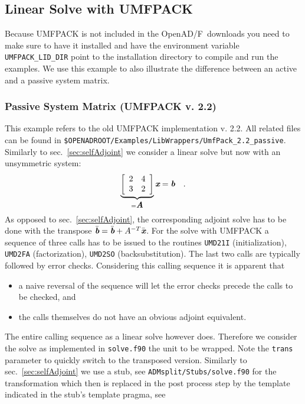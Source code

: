 \documentclass{book}
\newcommand{\OpenADF}{OpenAD/F}
\newcommand{\bmA}{\mbox{\bf\em A}}
\newcommand{\bmb}{\mbox{\bf\em b}}
\newcommand{\bmx}{\mbox{\bf\em x}}
\newcommand{\refsec}[1]{{sec.~\ref{#1}}}
\begin{document}
\subsection{Linear Solve with UMFPACK}\label{sec:umfpack}
Because UMFPACK \cite{umfpackWeb} is not included in the \OpenADF\ downloads you need to make sure to have it installed and have the environment variable \lstinline{UMFPACK_LID_DIR} point to the installation directory to compile and run the examples. 
We use this example to also illustrate the difference between an active and a passive system matrix. 
\subsubsection{Passive System Matrix (UMFPACK v. 2.2)}\label{sec:umfpackPassive}  
This example refers to the old UMFPACK implementation v. 2.2.  
All related files can be found in 
\lstinline{$OPENADROOT/Examples/LibWrappers/UmfPack_2.2_passive}. %
Similarly to \refsec{sec:selfAdjoint} we consider a linear solve but now with an unsymmetric system: 
\[
\underbrace{\left[\begin{array}{cc}
2 & 4 \\
3 & 2 
\end{array}\right]}_{=\bmA} \bmx=\bmb \quad .
\]
As opposed to \refsec{sec:selfAdjoint}, the corresponding adjoint solve has to be done with the transpose
$\bar{\bmb}=\bar{\bmb}+A^{-T}\bar{\bmx}$.
For the solve with UMFPACK a sequence of three calls has to be issued to the routines
\lstinline{UMD21I} (initialization),  \lstinline{UMD2FA} (factorization), \lstinline{UMD2SO} (backsubstitution).
The last two calls are typically followed by error checks. Considering this calling sequence it is apparent that 
\begin{itemize} 
\item a naive reversal of the sequence will let the error checks precede the calls to be checked, and 
\item the calls themselves do not have an obvious adjoint equivalent.
\end{itemize}
The entire calling sequence as a linear solve however does.  Therefore we consider the solve as implemented in 
\lstinline{solve.f90} the unit to be wrapped. Note the \lstinline{trans} parameter to quickly switch to the 
transposed version.
Similarly to \refsec{sec:selfAdjoint} we use a stub, see \lstinline{ADMsplit/Stubs/solve.f90} for the transformation
which then is replaced in the post process step by the template indicated in the stub's template pragma, see 
\end{document}
